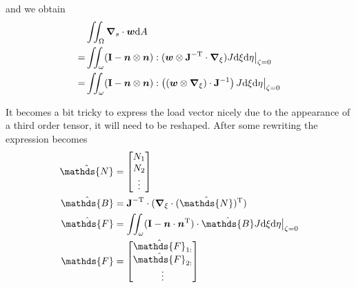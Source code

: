 \documentclass[a4paper,11pt]{article}
\renewcommand{\to}[1]{\text{\boldmath $#1$}} %
\newcommand{\ts}[1]{\text{\boldmath $\mathrm{#1}$}} %
\newcommand{\uv}[1]{\mathds{#1}}
\newcommand{\um}[1]{\mathds{#1}}
\newcommand{\intd}[1]{\mathrm{d}#1}
\newcommand{\norm}[1]{\left\lVert{#1}\right\rVert}
\newcommand{\T}{\mathrm{T}}
\begin{document}
and we obtain
\begin{align}
 &\iint_\Omega\to \nabla_s\cdot\to w\intd A\\
=&\iint_\omega(\ts I-\to n\otimes\to n):(\to w\otimes \ts J^{-\T}\cdot\to\nabla_\xi)J\intd\xi\intd\eta\big|_{\zeta=0}\\
=&\iint_\omega(\ts I-\to n\otimes\to n):\left((\to w\otimes\to\nabla_\xi) \cdot\ts J^{-1}\right)J\intd\xi\intd\eta\big|_{\zeta=0}
\end{align}


It becomes a bit tricky to express the load vector nicely due to the appearance of a third order tensor, it will need to be reshaped.
After some rewriting the expression becomes
\begin{align}
 \hat{\uv N} &= \begin{bmatrix} N_1\\ N_2\\ \vdots\end{bmatrix}\\
 \hat{\um B} &= \ts J^{-\T}\cdot(\to\nabla_\xi\cdot(\hat{\uv N})^\T)\\
 \hat{\um F} &= \iint_\omega(\ts I-\to n \cdot \to n^\T)\cdot \hat{\um B} J\intd\xi\intd\eta\big|_{\zeta=0}\\
 \uv F &= \begin{bmatrix}\hat{\uv F}_{1:}\\\hat{\uv F}_{2:}\\\vdots\end{bmatrix}
\end{align}
\end{document}
